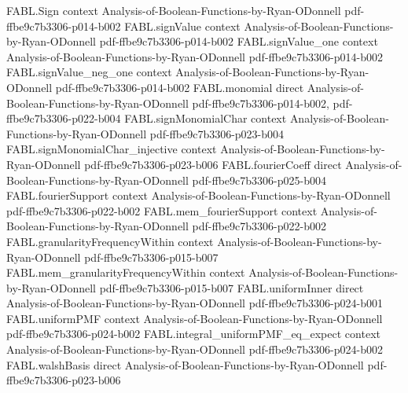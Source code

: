 \begin{theorem}
\label{FABL.FiniteFourierBasis.spectralDegree_le_iff}
\leanok
{}
\proofstep
  {FABL.Sign}
  {context}
  {Analysis-of-Boolean-Functions-by-Ryan-ODonnell}
  {pdf-ffbe9c7b3306-p014-b002}
\proofstep
  {FABL.signValue}
  {context}
  {Analysis-of-Boolean-Functions-by-Ryan-ODonnell}
  {pdf-ffbe9c7b3306-p014-b002}
\proofstep
  {FABL.signValue_one}
  {context}
  {Analysis-of-Boolean-Functions-by-Ryan-ODonnell}
  {pdf-ffbe9c7b3306-p014-b002}
\proofstep
  {FABL.signValue_neg_one}
  {context}
  {Analysis-of-Boolean-Functions-by-Ryan-ODonnell}
  {pdf-ffbe9c7b3306-p014-b002}
\proofstep
  {FABL.monomial}
  {direct}
  {Analysis-of-Boolean-Functions-by-Ryan-ODonnell}
  {pdf-ffbe9c7b3306-p014-b002,
    pdf-ffbe9c7b3306-p022-b004}
\proofstep
  {FABL.signMonomialChar}
  {context}
  {Analysis-of-Boolean-Functions-by-Ryan-ODonnell}
  {pdf-ffbe9c7b3306-p023-b004}
\proofstep
  {FABL.signMonomialChar_injective}
  {context}
  {Analysis-of-Boolean-Functions-by-Ryan-ODonnell}
  {pdf-ffbe9c7b3306-p023-b006}
\proofstep
  {FABL.fourierCoeff}
  {direct}
  {Analysis-of-Boolean-Functions-by-Ryan-ODonnell}
  {pdf-ffbe9c7b3306-p025-b004}
\proofstep
  {FABL.fourierSupport}
  {context}
  {Analysis-of-Boolean-Functions-by-Ryan-ODonnell}
  {pdf-ffbe9c7b3306-p022-b002}
\proofstep
  {FABL.mem_fourierSupport}
  {context}
  {Analysis-of-Boolean-Functions-by-Ryan-ODonnell}
  {pdf-ffbe9c7b3306-p022-b002}
\proofstep
  {FABL.granularityFrequencyWithin}
  {context}
  {Analysis-of-Boolean-Functions-by-Ryan-ODonnell}
  {pdf-ffbe9c7b3306-p015-b007}
\proofstep
  {FABL.mem_granularityFrequencyWithin}
  {context}
  {Analysis-of-Boolean-Functions-by-Ryan-ODonnell}
  {pdf-ffbe9c7b3306-p015-b007}
\proofstep
  {FABL.uniformInner}
  {direct}
  {Analysis-of-Boolean-Functions-by-Ryan-ODonnell}
  {pdf-ffbe9c7b3306-p024-b001}
\proofstep
  {FABL.uniformPMF}
  {context}
  {Analysis-of-Boolean-Functions-by-Ryan-ODonnell}
  {pdf-ffbe9c7b3306-p024-b002}
\proofstep
  {FABL.integral_uniformPMF_eq_expect}
  {context}
  {Analysis-of-Boolean-Functions-by-Ryan-ODonnell}
  {pdf-ffbe9c7b3306-p024-b002}
\proofstep
  {FABL.walshBasis}
  {direct}
  {Analysis-of-Boolean-Functions-by-Ryan-ODonnell}
  {pdf-ffbe9c7b3306-p023-b006}

\end{theorem}
